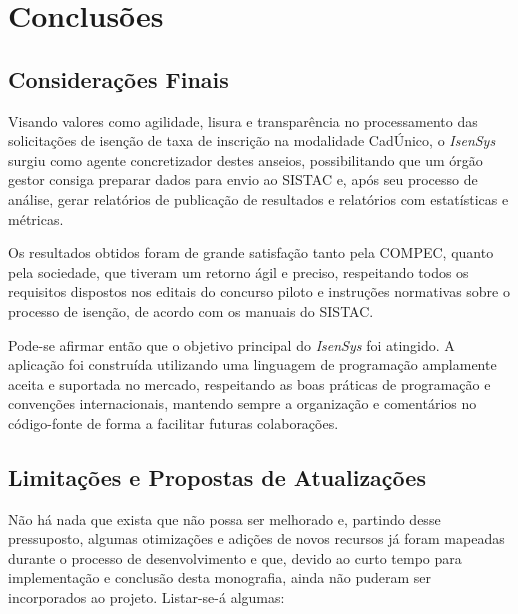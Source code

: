 \documentclass[
	12pt,			%
	openright,		%
	oneside,	
	a4paper,		%
	english,		%
	brazil			%
]{abntex2/abntex2}  %
\begin{document}
	\chapter{Conclusões}
	
		\section{Considerações Finais}
	
			Visando valores como agilidade, lisura e transparência no processamento das solicitações de isenção de taxa de inscrição na modalidade CadÚnico, o \textit{IsenSys} surgiu como agente concretizador destes anseios, possibilitando que um órgão gestor consiga preparar dados para envio ao SISTAC e, após seu processo de análise, gerar relatórios de publicação de resultados e relatórios com estatísticas e métricas.
			
			Os resultados obtidos foram de grande satisfação tanto pela COMPEC, quanto pela sociedade, que tiveram um retorno ágil e preciso, respeitando todos os requisitos dispostos nos editais do concurso piloto e instruções normativas sobre o processo de isenção, de acordo com os manuais do SISTAC.
			
			Pode-se afirmar então que o objetivo principal do \textit{IsenSys} foi atingido. A aplicação foi construída utilizando uma linguagem de programação amplamente aceita e suportada no mercado, respeitando as boas práticas de programação e convenções internacionais, mantendo sempre a organização e comentários no código-fonte de forma a facilitar futuras colaborações.
	
		\section{Limitações e Propostas de Atualizações}
		
			Não há nada que exista que não possa ser melhorado e, partindo desse pressuposto, algumas otimizações e adições de novos recursos já foram mapeadas durante o processo de desenvolvimento e que, devido ao curto tempo para implementação e conclusão desta monografia, ainda não puderam ser incorporados ao projeto. Listar-se-á algumas:
			
\end{document}
